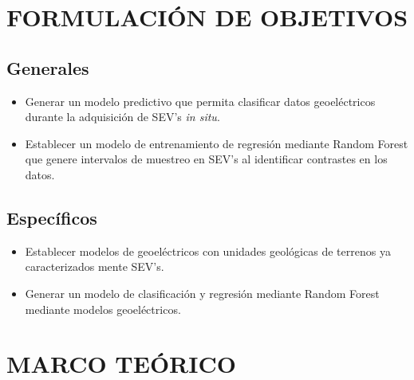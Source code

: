 \chapter{FORMULACIÓN DE OBJETIVOS}

\section{Generales}

\begin{itemize}
	\item Generar un modelo predictivo que permita clasificar datos geoeléctricos durante la adquisición de SEV's \textit{in situ}.
	\item Establecer un modelo de entrenamiento de regresión mediante Random Forest que genere intervalos de muestreo en SEV's al identificar contrastes en los datos.
\end{itemize}

\section{Específicos}


\begin{itemize}
	\item Establecer modelos de geoeléctricos con unidades geológicas de terrenos ya caracterizados mente SEV's.
	\item Generar un modelo de clasificación y regresión mediante Random Forest mediante modelos geoeléctricos.
\end{itemize}


\newpage


\chapter{MARCO TEÓRICO}
